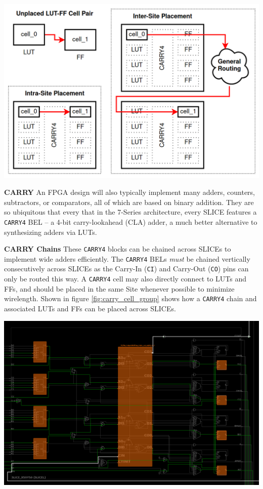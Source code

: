 \begin{multicols}{2}
{
    \centering
    \includegraphics[width=\columnwidth]{figures/intersite_intrasite_2.png}
    \label{fig:intersite_intrasite}
}


\newpage
\textbf{CARRY} \quad
An FPGA design will also typically implement many adders, counters, subtractors, or comparators, all of which are based on binary addition. 
They are so ubiquitous that every that in the 7-Series architecture, every SLICE features a \texttt{CARRY4} BEL -- a 4-bit carry-lookahead (CLA) adder, a much better alternative to synthesizing adders via LUTs. 

\textbf{CARRY Chains} \quad
These \texttt{CARRY4} blocks can be chained across SLICEs to implement wide adders efficiently. 
The \texttt{CARRY4} BELs \emph{must} be chained vertically consecutively across SLICEs as the Carry-In (\texttt{CI}) and Carry-Out (\texttt{CO}) pins can only be routed this way. 
A \texttt{CARRY4} cell may also directly connect to LUTs and FFs, and should be placed in the same Site whenever possible to minimize wirelength. 
Shown in figure \ref{fig:carry_cell_group} shows how a \texttt{CARRY4} chain and associated LUTs and FFs can be placed across SLICEs. 


{
    \centering
    \includegraphics[width=\columnwidth]{figures/carry_cell_group.png}
    \label{fig:carry_cell_group}
}


\end{multicols}
